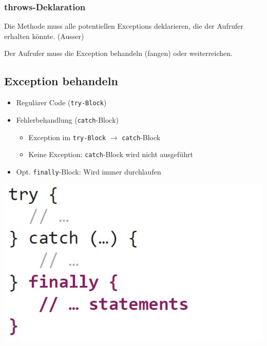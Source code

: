 \subsubsection{throws-Deklaration}
Die Methode muss alle potentiellen Exceptions deklarieren, die der Aufrufer erhalten könnte. (Ausser) %

Der Aufrufer muss die Exception behandeln (fangen) oder weiterreichen.

\subsection{Exception behandeln}
\begin{minipage}{0.6\columnwidth}
    \begin{itemize}
        \itemsep0em
        \item Regulärer Code (\verb|try-Block|)
        \item Fehlerbehandlung (\verb|catch|-Block)
        \begin{itemize}
            \itemsep0em
            \item Exception im \verb|try-Block| $\rightarrow$ \verb|catch|-Block
            \item Keine Exception: \verb|catch|-Block wird nicht ausgeführt
        \end{itemize}
        \item Opt. \verb|finally|-Block: Wird immer durchlaufen
    \end{itemize}
\end{minipage}
\hfill
\begin{minipage}{0.35\columnwidth}
    \includegraphics[width=\linewidth]{pictures/try-catch-finally.jpg}
\end{minipage}

